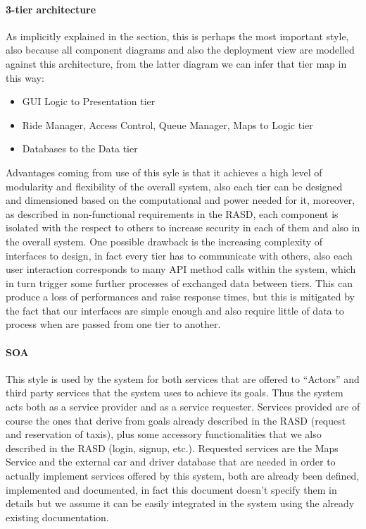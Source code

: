 \paragraph{3-tier architecture}
As implicitly explained in the  section, this is perhaps the most important style, also because all component diagrams and also the deployment view are modelled against this architecture, from the latter diagram we can infer that tier map in this way:
\begin{itemize}
	\item GUI Logic to Presentation tier 
	\item Ride Manager, Access Control, Queue Manager, Maps to Logic tier
	\item Databases to the Data tier
\end{itemize}
Advantages coming from use of this syle is that it achieves a high level of modularity and flexibility of the overall system, also each tier can be designed and dimensioned based on the computational and power needed for it, moreover, as described in non-functional requirements in the RASD, each component is isolated with the respect to others to increase security in each of them and also in the overall system. One possible drawback is the increasing complexity of interfaces to design, in fact every tier has to communicate with others, also each user interaction corresponds to many API method calls within the system, which in turn trigger some further processes of exchanged data between tiers. This can produce a loss of performances and raise response times, but this is mitigated by the fact that our interfaces are simple enough and also require little of data to process when are passed from one tier to another.
\paragraph{SOA}
This style is used by the system for both services that are offered to ``Actors'' and third party services that the system uses to achieve its goals. Thus the system acts both as a service provider and as a service requester. \newline
Services provided are of course the ones that derive from goals already described in the RASD (request and reservation of taxis), plus some accessory functionalities that we also described in the RASD (login, signup, etc.).\newline
Requested services are the Maps Service and the external car and driver database that are needed in order to actually implement services offered by this system, both are already been defined, implemented and documented, in fact this document doesn't specify them in details but we assume it can be easily integrated in the system using the already existing documentation. 

